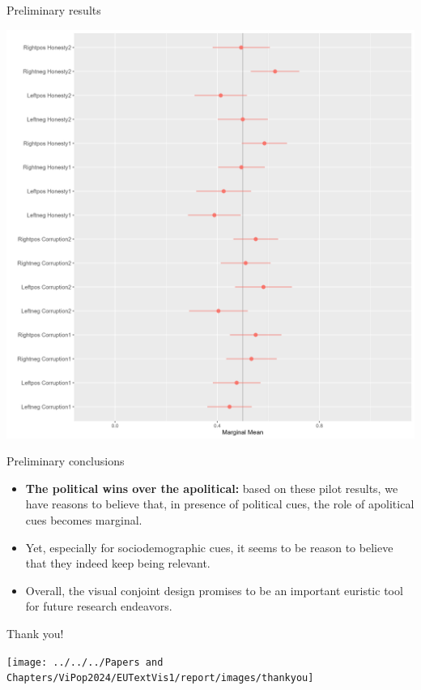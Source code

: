 \documentclass[
  ignorenonframetext,
]{beamer}
\begin{document}
\begin{frame}{Preliminary results}
\label{preliminary-results-3}
\begin{center}\includegraphics[width=0.75\linewidth]{Presentation/images/interaction3} \end{center}
\end{frame}

\begin{frame}{Preliminary conclusions}
\label{preliminary-conclusions}
\begin{itemize}
\item
  \textbf{The political wins over the apolitical:} based on these pilot
  results, we have reasons to believe that, in presence of political
  cues, the role of apolitical cues becomes marginal.
\item
  Yet, especially for sociodemographic cues, it seems to be reason to
  believe that they indeed keep being relevant.
\item
  Overall, the visual conjoint design promises to be an important
  euristic tool for future research endeavors.
\end{itemize}
\end{frame}

\begin{frame}{Thank you!}
\label{thank-you}
\begin{center}\texttt{[image: ../../../Papers and Chapters/ViPop2024/EUTextVis1/report/images/thankyou]} \end{center}
\end{frame}
\end{document}

